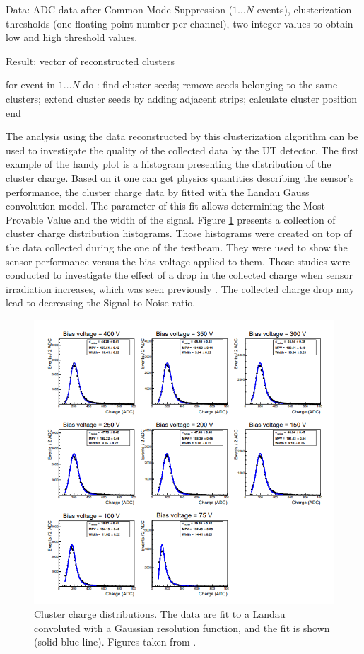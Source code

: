 \begin{algorithm}[caption={Cluster Creator algorithm}, label={al:cluster creator}]
Data: ADC data after Common Mode Suppression ($1 \ldots N$ events),
      clusterization thresholds (one floating-point number per channel),  
      two integer values to obtain low and high threshold values. 

Result: vector of reconstructed clusters

for event in $1 \ldots N$ do :
   find cluster seeds;
   remove seeds belonging to the same clusters;
   extend cluster seeds by adding adjacent strips;
   calculate cluster position
end
\end{algorithm}


The analysis using the data reconstructed by this clusterization algorithm can be used to investigate the quality of the collected data by the UT detector. The first example of the handy plot is a histogram presenting the distribution of the cluster charge. Based on it one can get physics quantities describing the sensor's performance, the cluster charge data by fitted with the Landau Gauss convolution model. The parameter of this fit allows determining the Most Provable Value and the width of the signal.  Figure \ref{fig:clusters_with_landau} presents a collection of cluster charge distribution histograms. Those histograms were created on top of the data collected during the one of the testbeam. They were used to show the sensor performance versus the bias voltage applied to them.  Those studies were conducted to investigate the effect of a drop in the collected charge when sensor irradiation increases, which was seen previously \cite{irradiation}. The collected charge drop may lead to decreasing the Signal to Noise ratio.  


\begin{figure}
\centering
\includegraphics{figures/landau.png}
\caption{Cluster charge distributions. The data are fit to a Landau 
convoluted with a Gaussian resolution function, and the fit is shown (solid blue line). Figures taken from \cite{tb1}. 
}\label{fig:clusters_with_landau}
\end{figure}

